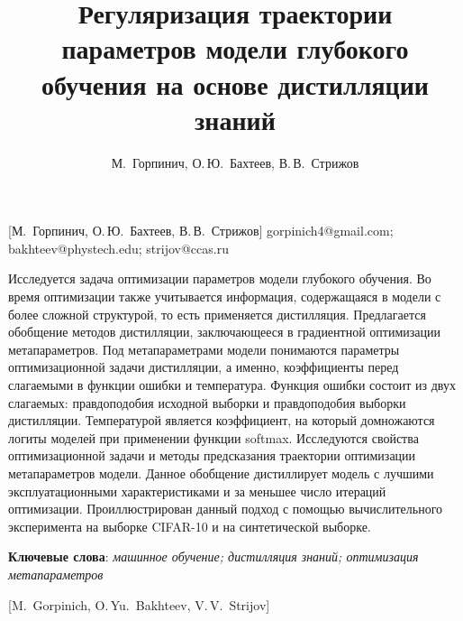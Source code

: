 \documentclass[12pt, twoside]{article}
\begin{document}
\title
    [Оптимизация параметров модели на основе дистилляции знаний] %
    {Регуляризация траектории параметров модели глубокого обучения на основе дистилляции знаний}
\author
    [М.~Горпинич] %
    {М.~Горпинич, О.\,Ю.~Бахтеев, В.\,В.~Стрижов} %
    [М.~Горпинич, О.\,Ю.~Бахтеев, В.\,В.~Стрижов] %
\email
    {gorpinich4@gmail.com; bakhteev@phystech.edu;  strijov@ccas.ru}
\abstract
    {Исследуется задача оптимизации параметров модели глубокого обучения. Во время оптимизации также учитывается информация, содержащаяся в модели с более сложной структурой, то есть применяется дистилляция. Предлагается обобщение методов дистилляции, заключающееся в градиентной оптимизации метапараметров. Под метапараметрами модели понимаются параметры оптимизационной задачи дистилляции, а именно, коэффициенты перед слагаемыми в функции ошибки и температура. Функция ошибки состоит из двух слагаемых: правдоподобия исходной выборки и правдоподобия выборки дистилляции. Температурой является коэффициент, на который домножаются логиты моделей при применении функции softmax. Исследуются свойства оптимизационной задачи и методы предсказания траектории оптимизации метапараметров модели. Данное обобщение дистиллирует модель с лучшими эксплуатационными характеристиками и за меньшее число итераций оптимизации. Проиллюстрирован данный подход с помощью вычислительного эксперимента на выборке CIFAR-10 и на синтетической выборке.
	
\bigskip
\noindent
\textbf{Ключевые слова}: \emph {машинное обучение; дистилляция знаний; оптимизация метапараметров}
}

    [M.~Gorpinich, O.\,Yu.~Bakhteev, V.\,V.~Strijov] %
\end{document}
